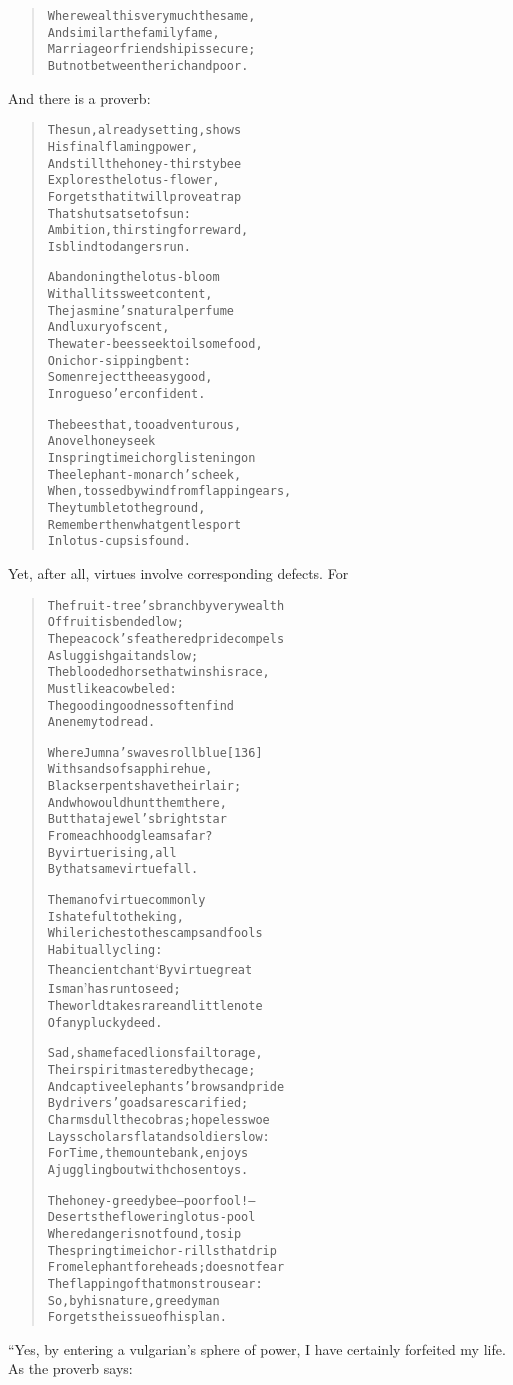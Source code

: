 \documentclass[article, twoside, 14pt]{memoir}
\renewenvironment{verbatim}{%
\begin{quote}%
\vskip -10pt%
\begin{alltt}\normalfont\large}{\end{alltt}%
\end{quote}%
\vskip -10pt
} %
\begin{document}
\begin{verbatim}
Where wealth is very much the same,
And similar the family fame,
Marriage or friendship is secure;
But not between the rich and poor.
\end{verbatim}
And there is a proverb:

\begin{verbatim}
The sun, already setting, shows
    His final flaming power,
And still the honey-thirsty bee
    Explores the lotus-flower,
Forgets that it will prove a trap
    That shuts at set of sun:
Ambition, thirsting for reward,
    Is blind to dangers run.

Abandoning the lotus-bloom
    With all its sweet content,
The jasmine's natural perfume
    And luxury of scent,
The water-bees seek toilsome food,
    On ichor-sipping bent:
So men reject the easy good,
    In rogues o'erconfident.

The bees that, too adventurous,
    A novel honey seek
In springtime ichor glistening on
    The elephant-monarch's cheek,
When, tossed by wind from flapping ears,
    They tumble to the ground,
Remember then what gentle sport
    In lotus-cups is found.
\end{verbatim}
Yet, after all, virtues involve corresponding defects. For

\begin{verbatim}
The fruit-tree's branch by very wealth
    Of fruit is bended low;
The peacock's feathered pride compels
    A sluggish gait and slow;
The blooded horse that wins his race,
    Must like a cow be led:
The good in goodness often find
    An enemy to dread.

Where Jumna's waves roll blue                           [136]
With sands of sapphire hue,
Black serpents have their lair;
And who would hunt them there,
But that a jewel's bright star
From each hood gleams afar?
By virtue rising, all
By that same virtue fall.

The man of virtue commonly
    Is hateful to the king,
While riches to the scamps and fools
    Habitually cling:
The ancient chant ‘By virtue great
    Is man’ has run to seed;
The world takes rare and little note
    Of any plucky deed.

Sad, shamefaced lions fail to rage,
Their spirit mastered by the cage;
And captive elephants' brows and pride
By drivers' goads are scarified;
Charms dull the cobras; hopeless woe
Lays scholars flat and soldiers low:
For Time, the mountebank, enjoys
A juggling bout with chosen toys.

The honey-greedy bee--poor fool!--
Deserts the flowering lotus-pool
Where danger is not found, to sip
The springtime ichor-rills that drip
From elephant foreheads; does not fear
The flapping of that monstrous ear:
So, by his nature, greedy man
Forgets the issue of his plan.
\end{verbatim}
“Yes, by entering a vulgarian's sphere of power, I have certainly
forfeited my life. As the proverb says:
\end{document}
